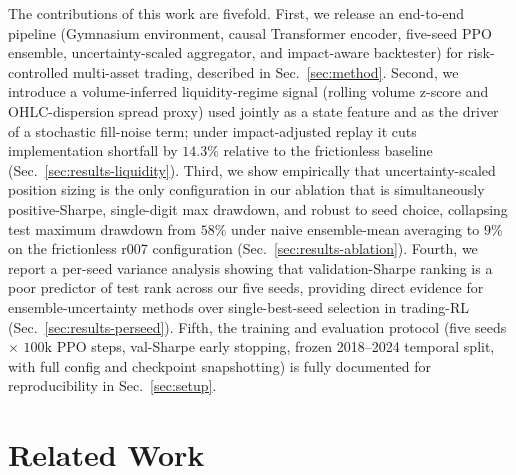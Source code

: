 \documentclass[conference]{IEEEtran}
\begin{document}
The contributions of this work are fivefold.
First, we release an end-to-end pipeline (Gymnasium environment,
causal Transformer encoder, five-seed PPO ensemble, uncertainty-scaled
aggregator, and impact-aware backtester) for risk-controlled
multi-asset trading, described in Sec.~\ref{sec:method}.
Second, we introduce a volume-inferred liquidity-regime signal
(rolling volume z-score and OHLC-dispersion spread proxy) used jointly
as a state feature and as the driver of a stochastic fill-noise term;
under impact-adjusted replay it cuts implementation shortfall by
$14.3\%$ relative to the frictionless baseline
(Sec.~\ref{sec:results-liquidity}).
Third, we show empirically that uncertainty-scaled position sizing is
the only configuration in our ablation that is simultaneously
positive-Sharpe, single-digit max drawdown, and robust to seed choice,
collapsing test maximum drawdown from $58\%$ under naive ensemble-mean
averaging to $9\%$ on the frictionless r007 configuration
(Sec.~\ref{sec:results-ablation}).
Fourth, we report a per-seed variance analysis showing that
validation-Sharpe ranking is a poor predictor of test rank across our
five seeds, providing direct evidence for ensemble-uncertainty methods
over single-best-seed selection in trading-RL
(Sec.~\ref{sec:results-perseed}).
Fifth, the training and evaluation protocol (five seeds $\times$
$100\text{k}$ PPO steps, val-Sharpe early stopping, frozen 2018--2024
temporal split, with full config and checkpoint snapshotting) is fully
documented for reproducibility in Sec.~\ref{sec:setup}.

\section{Related Work}
\label{sec:related}
\end{document}
